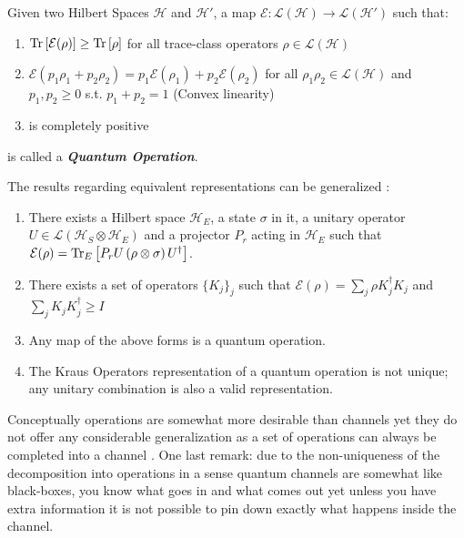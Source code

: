 \begin{definition}
  Given two Hilbert Spaces $\mathcal{H}$ and $\mathcal{H}'$, a map $\mathcal{E}:\mathcal{L}(\mathcal{H})\to\mathcal{L}(\mathcal{H}')$ such that:
  \begin{enumerate}
          \item $\mathrm{Tr}\left[\mathcal{E}(\rho)\right]\geq\mathrm{Tr}\left[\rho\right]$ for all trace-class operators $\rho \in \mathcal{L}(\mathcal{H})$
          \item $\mathcal{E}(p_{1}\rho_{1}+p_{2}\rho_{2}) =p_{1}\mathcal{E}(\rho_{1})+p_{2}\mathcal{E}(\rho_{2}) $ for all $\rho_{1} \rho_{2} \in \mathcal{L}(\mathcal{H})$ and $p_{1}, p_{2} \geq 0$ s.t. $p_{1}+p_{2}=1$ (Convex linearity)
          \item is completely positive
  \end{enumerate}
  is called a \textbf{\textit{Quantum Operation}}.
\end{definition}
The results regarding equivalent representations can be generalized \cite{strasberg2022quantum,wiseman_quantum_2010}:
\begin{enumerate}
  \item There exists a Hilbert space $\mathcal{H}_{E}$, a state $\sigma$ in it, a unitary operator $U \in\mathcal{L}(\mathcal{H}_{S}\otimes\mathcal{H}_{E})$ and a  projector $P_{r}$ acting in $\mathcal{H}_{E}$ such that $\mathcal{E}(\rho) = \mathrm{Tr}_{E}\left[P_{r}U\left(\rho\otimes\sigma\right)U^{\dagger}\right]$.
  \item There exists a set of operators $\{K_{j} \}_{j}$ such that $\mathcal{E}(\rho) = \sum_{j}\rho K_{j}^{\dagger}K_{j}$ and $\sum_{j}K_{j}K_{j}^{\dagger}\geq I$
  \item Any map of the above forms is a quantum operation.
  \item The Kraus Operators representation of a quantum operation is not unique; any unitary combination is also a valid representation.
\end{enumerate}
Conceptually operations are somewhat more desirable than channels yet they do not offer any considerable generalization as a set of operations
can always be completed into a channel \cite{nielsen_quantum_2010}. One last remark: due to the non-uniqueness of the decomposition into operations in a sense quantum channels are somewhat like black-boxes,
you know what goes in and what comes out yet unless you have extra information it is not possible to pin down exactly what happens inside the
channel.
